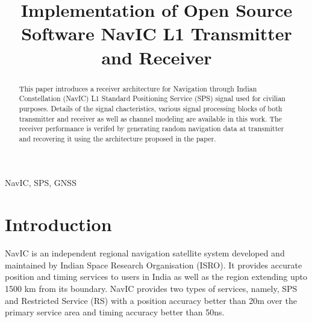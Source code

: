 \documentclass[conference]{IEEEtran}
\begin{document}
\title{Implementation of Open Source Software NavIC L1 Transmitter and Receiver\\
}

\author{
\and
{}
\and
{}

}

\maketitle

\begin{abstract}
This paper introduces a receiver architecture
	for 	Navigation through Indian Constellation (NavIC) L1 
	Standard Positioning 
Service (SPS) signal  used for civilian purposes. 
Details of the signal chacteristics, various signal processing blocks of both transmitter and receiver as well as channel modeling are available in this work. The receiver performance is verifed by 
generating random navigation data at transmitter and recovering it using the architecture proposed in the paper.
\end{abstract}

\begin{IEEEkeywords}
NavIC, SPS, GNSS 
\end{IEEEkeywords}

\section{Introduction}
NavIC \cite{b2} is an independent regional navigation satellite system developed and maintained by Indian Space Research 
Organisation (ISRO). 
It provides accurate position and timing services to users in India as well as the region extending
upto 1500 km from its boundary. NavIC provides two types of services, namely, SPS   and Restricted Service (RS) with a position accuracy better than 20m over the 
primary service area and timing accuracy better than 50ns.  
\end{document}
